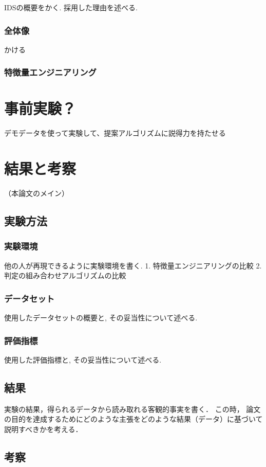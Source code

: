 \documentclass{css}
\begin{document}
IDSの概要をかく.
採用した理由を述べる.

\subsubsection{全体像}
かける

\subsubsection{特徴量エンジニアリング}

\section{事前実験？}
デモデータを使って実験して、提案アルゴリズムに説得力を持たせる


\section{結果と考察}
（本論文のメイン）

\subsection{実験方法}

\subsubsection{実験環境}
他の人が再現できるように実験環境を書く.
1. 特徴量エンジニアリングの比較
2. 判定の組み合わせアルゴリズムの比較

\subsubsection{データセット}
使用したデータセットの概要と, その妥当性について述べる.

\subsubsection{評価指標}
使用した評価指標と, その妥当性について述べる.

\subsection{結果}
実験の結果，得られるデータから読み取れる客観的事実を書く．
この時， 論文の目的を達成するためにどのような主張をどのような結果（データ）に基づいて説明すべきかを考える．

\subsection{考察}
\end{document}
